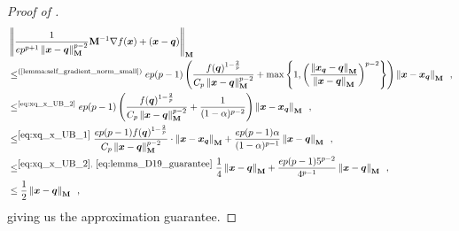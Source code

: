 \begin{proof}[Proof of ]
\begin{align*}
    &\norm{\frac{1}{ep^{p+1}\norm{\vx-\vq}_{\mM}^{p-2}}\mM^{-1}\nabla f(\vx)+(\vx-\vq)}_{\mM} \\
    &\le^{\text{(\Cref{lemma:self_gradient_norm_small})}} ep(p-1)\inparen{\frac{f(\vq)^{1-\frac{2}{p}}}{C_p\norm{\vx-\vq}_{\mM}^{p-2}}+\max\inbraces{1, \inparen{\frac{\norm{\vx_{\vq}-\vq}_{\mM}}{\norm{\vx-\vq}_{\mM}}}^{p-2}}}\norm{\vx-\vx_{\vq}}_{\mM}\enspace,\\
    &\le^{\text{\eqref{eq:xq_x_UB_2}}} ep(p-1)\inparen{\frac{f(\vq)^{1-\frac{2}{p}}}{C_p\norm{\vx-\vq}_{\mM}^{p-2}}+\frac{1}{(1-\alpha)^{p-2}}}\norm{\vx-\vx_{\vq}}_{\mM}\enspace,\\
    &\le^{\eqref{eq:xq_x_UB_1}} \frac{ep(p-1)f(\vq)^{1-\frac{2}{p}}}{C_p\norm{\vx-\vq}_{\mM}^{p-2}} \cdot \norm{\vx-\vx_{\vq}}_{\mM} + \frac{ep(p-1)\alpha}{(1-\alpha)^{p-1}}\norm{\vx-\vq}_{\mM}\enspace,\\ 
    &\leq^{\eqref{eq:xq_x_UB_2},\ \eqref{eq:lemma_D19_guarantee}} \frac{1}{4}\norm{\vx-\vq}_{\mM} + \frac{ep(p-1)5^{p-2}}{4^{p-1}}\norm{\vx-\vq}_{\mM}\enspace,\\
    &\le \frac{1}{2}\norm{\vx-\vq}_{\mM}\enspace,
\end{align*}
giving us the approximation guarantee.


\end{proof}
